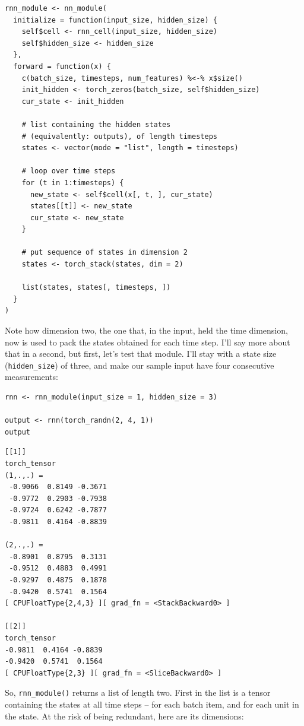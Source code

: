\documentclass[
  letterpaper,
]{krantz}
\begin{document}
\begin{verbatim}
rnn_module <- nn_module(
  initialize = function(input_size, hidden_size) {
    self$cell <- rnn_cell(input_size, hidden_size)
    self$hidden_size <- hidden_size
  },
  forward = function(x) {
    c(batch_size, timesteps, num_features) %<-% x$size()
    init_hidden <- torch_zeros(batch_size, self$hidden_size)
    cur_state <- init_hidden

    # list containing the hidden states
    # (equivalently: outputs), of length timesteps
    states <- vector(mode = "list", length = timesteps)

    # loop over time steps
    for (t in 1:timesteps) {
      new_state <- self$cell(x[, t, ], cur_state)
      states[[t]] <- new_state
      cur_state <- new_state
    }

    # put sequence of states in dimension 2
    states <- torch_stack(states, dim = 2)

    list(states, states[, timesteps, ])
  }
)
\end{verbatim}

Note how dimension two, the one that, in the input, held the time
dimension, now is used to pack the states obtained for each time step.
I'll say more about that in a second, but first, let's test that module.
I'll stay with a state size (\texttt{hidden\_size}) of three, and make
our sample input have four consecutive measurements:

\begin{verbatim}
rnn <- rnn_module(input_size = 1, hidden_size = 3)

output <- rnn(torch_randn(2, 4, 1))
output
\end{verbatim}

\begin{verbatim}
[[1]]
torch_tensor
(1,.,.) = 
 -0.9066  0.8149 -0.3671
 -0.9772  0.2903 -0.7938
 -0.9724  0.6242 -0.7877
 -0.9811  0.4164 -0.8839

(2,.,.) = 
 -0.8901  0.8795  0.3131
 -0.9512  0.4883  0.4991
 -0.9297  0.4875  0.1878
 -0.9420  0.5741  0.1564
[ CPUFloatType{2,4,3} ][ grad_fn = <StackBackward0> ]

[[2]]
torch_tensor
-0.9811  0.4164 -0.8839
-0.9420  0.5741  0.1564
[ CPUFloatType{2,3} ][ grad_fn = <SliceBackward0> ]
\end{verbatim}

So, \texttt{rnn\_module()} returns a list of length two. First in the
list is a tensor containing the states at all time steps -- for each
batch item, and for each unit in the state. At the risk of being
redundant, here are its dimensions:
\end{document}
